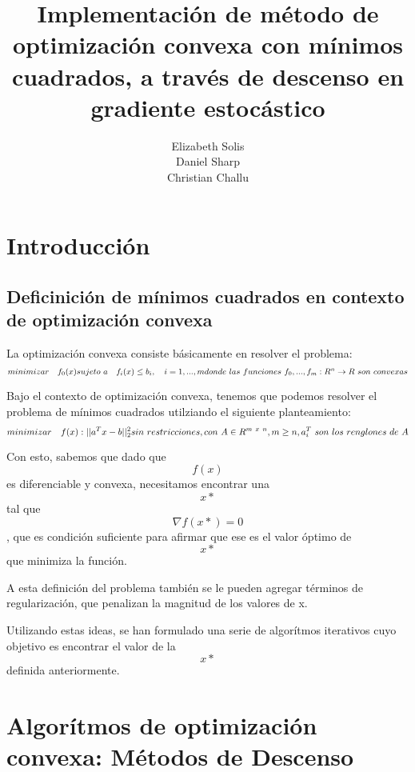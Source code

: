 \documentclass[]{article}
\title{Implementación de método de optimización convexa con mínimos cuadrados,
a través de descenso en gradiente estocástico}
\author{Elizabeth Solis \\ Daniel Sharp \\ Christian Challu}
\date{}
\begin{document}
\maketitle

\newpage

\tableofcontents

\newpage

\section{Introducción}

\subsection{Deficinición de mínimos cuadrados en contexto de optimización convexa}

La optimización convexa consiste básicamente en resolver el problema:\\
\[minimizar \quad f_0(x) \\
  sujeto \ a \quad f_i(x) \leq b_i, \quad i=1,...,m  \\
  donde \ las \ funciones \ f_0,...,f_m:R^n \to R \ son \ convexas\]

Bajo el contexto de optimización convexa, tenemos que podemos resolver
el problema de mínimos cuadrados utilziando el siguiente
planteamiento:\\
\[minimizar \quad f(x):||a^Tx -b||^2_2 \\
sin \ restricciones, \\
con \ A \in R^{m \ x \ n}, m \geq n, a_i^T \ son \ los \ renglones \ de \ A\]

Con esto, sabemos que dado que \[f(x)\] es diferenciable y convexa,
necesitamos encontrar una \[x*\] tal que \[\nabla f(x*) = 0\], que es
condición suficiente para afirmar que ese es el valor óptimo de \[x*\]
que minimiza la función.

A esta definición del problema también se le pueden agregar términos de
regularización, que penalizan la magnitud de los valores de x.

Utilizando estas ideas, se han formulado una serie de algorítmos
iterativos cuyo objetivo es encontrar el valor de la \[x*\] definida
anteriormente.

\newpage

\section{Algorítmos de optimización convexa: Métodos de Descenso}
\end{document}

